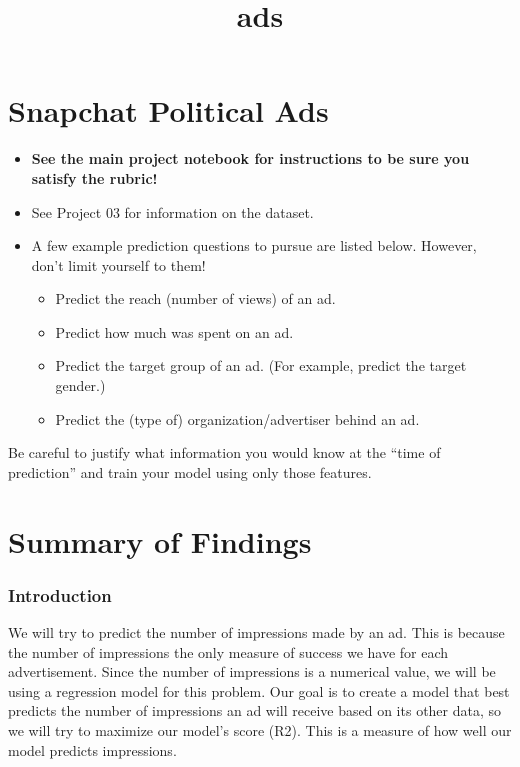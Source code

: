 \documentclass[11pt]{article}
\title{ads}
\providecommand{\tightlist}{%
      \setlength{\itemsep}{0pt}\setlength{\parskip}{0pt}}
\begin{document}
    
    
    \maketitle
    
    

    
    \hypertarget{snapchat-political-ads}{%
\section{Snapchat Political Ads}\label{snapchat-political-ads}}

\begin{itemize}
\tightlist
\item
  \textbf{See the main project notebook for instructions to be sure you
  satisfy the rubric!}
\item
  See Project 03 for information on the dataset.
\item
  A few example prediction questions to pursue are listed below.
  However, don't limit yourself to them!

  \begin{itemize}
  \tightlist
  \item
    Predict the reach (number of views) of an ad.
  \item
    Predict how much was spent on an ad.
  \item
    Predict the target group of an ad. (For example, predict the target
    gender.)
  \item
    Predict the (type of) organization/advertiser behind an ad.
  \end{itemize}
\end{itemize}

Be careful to justify what information you would know at the ``time of
prediction'' and train your model using only those features.

    \hypertarget{summary-of-findings}{%
\section{Summary of Findings}\label{summary-of-findings}}

\hypertarget{introduction}{%
\subsubsection{Introduction}\label{introduction}}

We will try to predict the number of impressions made by an ad. This is
because the number of impressions the only measure of success we have
for each advertisement. Since the number of impressions is a numerical
value, we will be using a regression model for this problem. Our goal is
to create a model that best predicts the number of impressions an ad
will receive based on its other data, so we will try to maximize our
model's score (R2). This is a measure of how well our model predicts
impressions.
\end{document}
